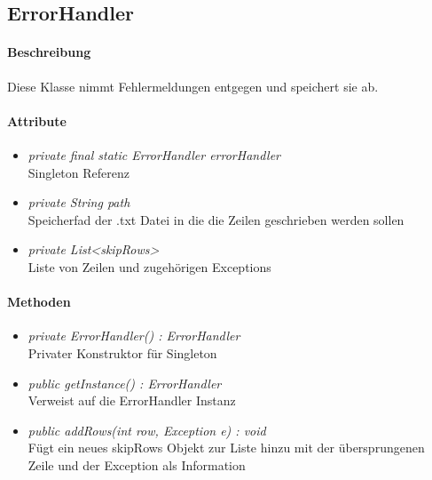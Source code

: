 \subsection{ErrorHandler}

\paragraph{Beschreibung}
Diese Klasse nimmt Fehlermeldungen entgegen und speichert sie ab.

\paragraph{Attribute}
\begin{itemize}
\item \textit{private final static ErrorHandler errorHandler}
\\ Singleton Referenz
\item \textit{private String path}
\\ Speicherfad der .txt Datei in die die Zeilen geschrieben werden sollen
\item \textit{private List<skipRows>}
\\ Liste von Zeilen und zugehörigen Exceptions
\end{itemize}

\paragraph{Methoden}

\begin{itemize}
\item \textit{private ErrorHandler() : ErrorHandler}  \\Privater Konstruktor für Singleton
\item \textit{public getInstance() : ErrorHandler} \\Verweist auf die ErrorHandler Instanz
\item \textit{public addRows(int row, Exception e) : void}
\\Fügt ein neues skipRows Objekt zur Liste hinzu mit der übersprungenen Zeile und der Exception als Information 

\end{itemize}